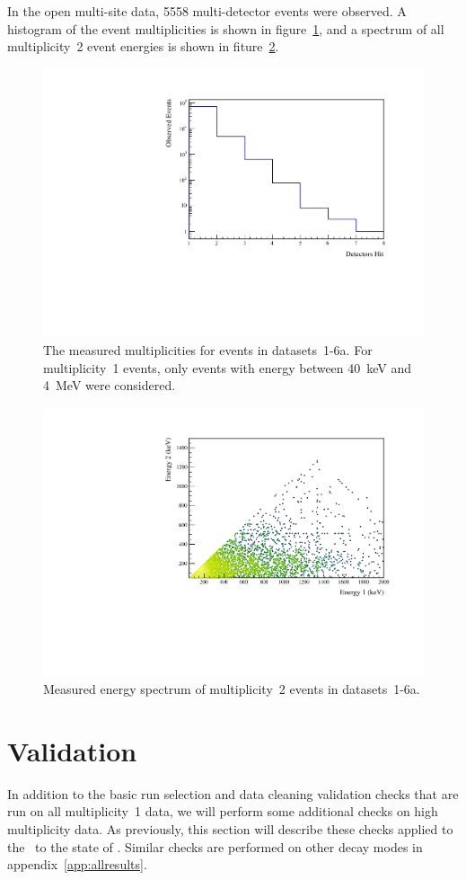 \documentclass[/main.tex]{subfiles}
\begin{document}
In the open multi-site data, 5558 multi-detector events were observed.
A histogram of the event multiplicities is shown in figure~\ref{fig:datamult}, and a spectrum of all multiplicity~2 event energies is shown in fiture~\ref{fig:data2D}.
\begin{figure}[h]
  \centering
  \includegraphics[width=.6\linewidth]{DataMultiplicity}
  \caption[Measured event multiplicities]{\label{fig:datamult}
    The measured multiplicities for events in datasets~1-6a. For multiplicity~1 events, only events with energy between 40~keV and 4~MeV were considered.
  }
\end{figure}
\begin{figure}[h]
  \centering
  \includegraphics[width=.8\linewidth]{Data2D}
  \caption[Measured energy spectrum of multiplicity~2 events]{\label{fig:data2D}
    Measured energy spectrum of multiplicity~2 events in datasets~1-6a.
  }
\end{figure}

\section{Validation}
In addition to the basic run selection and data cleaning validation checks that are run on all multiplicity~1 data, we will perform some additional checks on high multiplicity data.
As previously, this section will describe these checks applied to the \tnbb\ to the  state of .
Similar checks are performed on other decay modes in appendix~\ref{app:allresults}.
\end{document}
